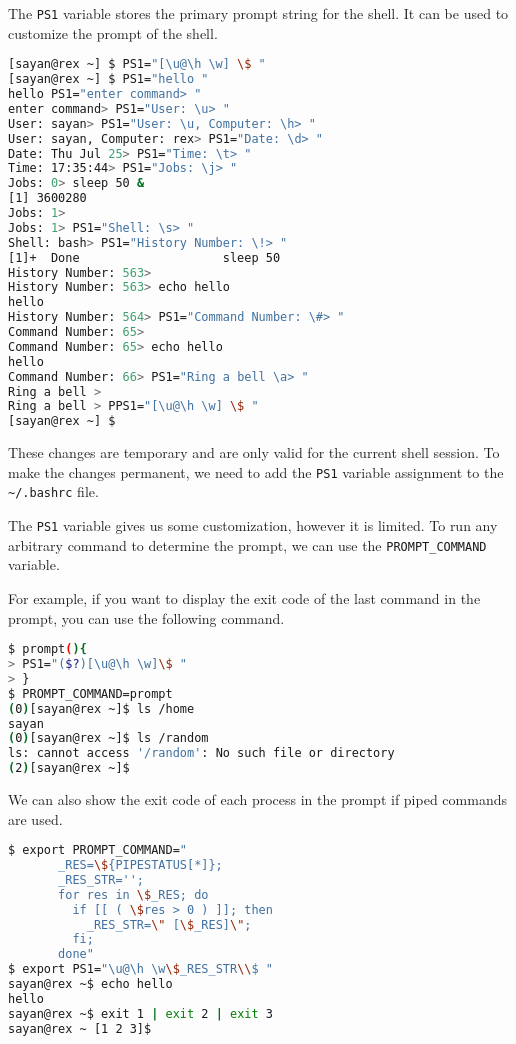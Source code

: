 The \lstinline{PS1} variable stores the primary prompt string for the shell.
It can be used to customize the prompt of the shell.

\begin{lstlisting}[language=bash]
[sayan@rex ~] $ PS1="[\u@\h \w] \$ "
[sayan@rex ~] $ PS1="hello "
hello PS1="enter command> "
enter command> PS1="User: \u> "
User: sayan> PS1="User: \u, Computer: \h> "
User: sayan, Computer: rex> PS1="Date: \d> "
Date: Thu Jul 25> PS1="Time: \t> "
Time: 17:35:44> PS1="Jobs: \j> "
Jobs: 0> sleep 50 &
[1] 3600280
Jobs: 1>
Jobs: 1> PS1="Shell: \s> "
Shell: bash> PS1="History Number: \!> "
[1]+  Done                    sleep 50
History Number: 563>
History Number: 563> echo hello
hello
History Number: 564> PS1="Command Number: \#> "
Command Number: 65>
Command Number: 65> echo hello
hello
Command Number: 66> PS1="Ring a bell \a> "
Ring a bell >
Ring a bell > PPS1="[\u@\h \w] \$ "
[sayan@rex ~] $
\end{lstlisting}

These changes are temporary and are only valid for the current shell session.
To make the changes permanent, we need to add the \lstinline{PS1} variable assignment to the \lstinline{~/.bashrc} file.

The \lstinline|PS1| variable gives us some customization, however it is limited.
To run any arbitrary command to determine the prompt, we can use the \lstinline|PROMPT_COMMAND| variable.

For example, if you want to display the exit code of the last command in the prompt, you can use the following command.

\begin{lstlisting}[language=bash]
$ prompt(){
> PS1="($?)[\u@\h \w]\$ "
> }
$ PROMPT_COMMAND=prompt
(0)[sayan@rex ~]$ ls /home
sayan
(0)[sayan@rex ~]$ ls /random
ls: cannot access '/random': No such file or directory
(2)[sayan@rex ~]$
\end{lstlisting}

We can also show the exit code of each process in the prompt if piped commands are used.

\begin{lstlisting}[language=bash]
$ export PROMPT_COMMAND="
       _RES=\${PIPESTATUS[*]};
       _RES_STR='';
       for res in \$_RES; do
         if [[ ( \$res > 0 ) ]]; then
           _RES_STR=\" [\$_RES]\";
         fi;
       done"
$ export PS1="\u@\h \w\$_RES_STR\\$ "
sayan@rex ~$ echo hello
hello
sayan@rex ~$ exit 1 | exit 2 | exit 3
sayan@rex ~ [1 2 3]$
\end{lstlisting}


